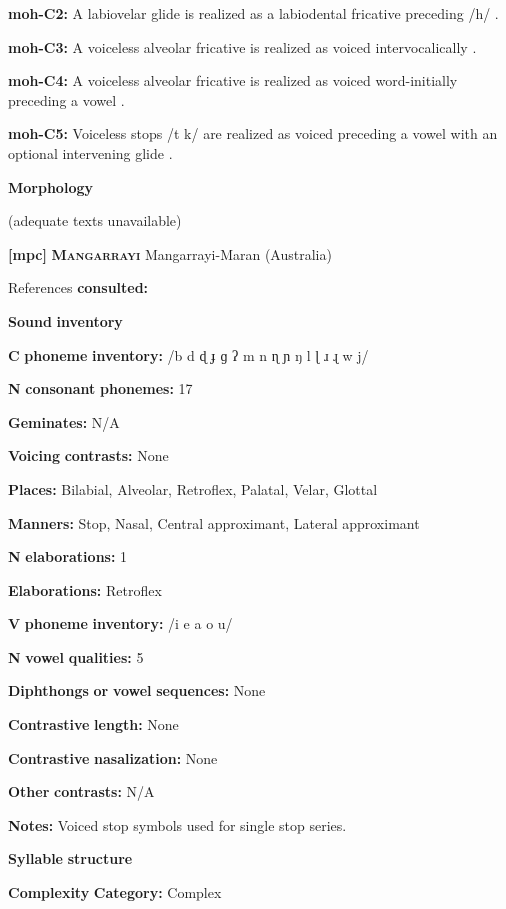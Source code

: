 \textbf{moh-C2:} A labiovelar glide is realized as a labiodental fricative preceding /h/ \citep[34]{Bonvillain1973}.

\textbf{moh-C3:} A voiceless alveolar fricative is realized as voiced intervocalically \citep{Bonvillain1973}.

\textbf{moh-C4:} A voiceless alveolar fricative is realized as voiced word-initially preceding a vowel \citep{Bonvillain1973}.

\textbf{moh-C5:} Voiceless stops /t k/ are realized as voiced preceding a vowel with an optional intervening glide \citep[28]{Bonvillain1973}.

\textbf{Morphology}

(adequate texts unavailable)

\textbf{[mpc]}   \textbf{\textsc{Mangarrayi}  }  Mangarrayi-Maran (Australia)

References \textbf{consulted:} \citet{Merlan1989}

\textbf{Sound} \textbf{inventory}

\textbf{C} \textbf{phoneme} \textbf{inventory:} /b d ɖ ɟ ɡ ʔ m n ɳ ɲ ŋ l ɭ ɹ ɻ w j/

\textbf{N} \textbf{consonant} \textbf{phonemes:} 17

\textbf{Geminates:} N/A

\textbf{Voicing} \textbf{contrasts:} None

\textbf{Places:} Bilabial, Alveolar, Retroflex, Palatal, Velar, Glottal

\textbf{Manners:} Stop, Nasal, Central approximant, Lateral approximant

\textbf{N} \textbf{elaborations:} 1

\textbf{Elaborations:} Retroflex

\textbf{V} \textbf{phoneme} \textbf{inventory:} /i e a o u/

\textbf{N} \textbf{vowel} \textbf{qualities:} 5

\textbf{Diphthongs} \textbf{or} \textbf{vowel} \textbf{sequences:} None

\textbf{Contrastive} \textbf{length:} None

\textbf{Contrastive} \textbf{nasalization:} None

\textbf{Other} \textbf{contrasts:} N/A

\textbf{Notes:} Voiced stop symbols used for single stop series.

\textbf{Syllable} \textbf{structure}

\textbf{Complexity} \textbf{Category:} Complex

